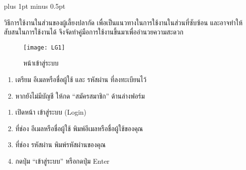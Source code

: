 
\clearpage
\thispagestyle{empty}

\begingroup
\fontsize{16pt}{19.2pt}\selectfont
\justifying
\XeTeXlinebreakskip=0pt plus 1pt minus 0.5pt
\setlength{\parindent}{1.5cm}
\setlength{\parskip}{0pt}

\par

\par

\indent วิธีการใช้งานในส่วนของผู้เลี้ยงปลากัด เพื่อเป็นแนวทางในการใช้งานในส่วนที่ซับซ้อน และอาจทำให้สับสนในการใช้งานได้ จึงจัดทำคู่มือการใช้งานขึ้นมาเพื่ออำนวยความสะดวก

\vspace{\baselineskip}

\begin{figure}[h]
	\centering
	\texttt{[image: LG1]}
	\caption{หน้าเข้าสู่ระบบ}
\end{figure}

\par

\begin{sloppypar}
	\begin{enumerate}
		\item เตรียม อีเมลหรือชื่อผู้ใช้ และ รหัสผ่าน ที่ลงทะเบียนไว้
		\item หากยังไม่มีบัญชี ให้กด “สมัครสมาชิก” ด้านล่างฟอร์ม
	\end{enumerate}
\end{sloppypar}

\par

\begin{sloppypar}
	\begin{enumerate}
		\item เปิดหน้า เข้าสู่ระบบ (Login)
		\item ที่ช่อง อีเมลหรือชื่อผู้ใช้ พิมพ์อีเมลหรือชื่อผู้ใช้ของคุณ
		\item ที่ช่อง รหัสผ่าน พิมพ์รหัสผ่านของคุณ
		\item กดปุ่ม “เข้าสู่ระบบ” หรือกดปุ่ม Enter
	\end{enumerate}
\end{sloppypar}

